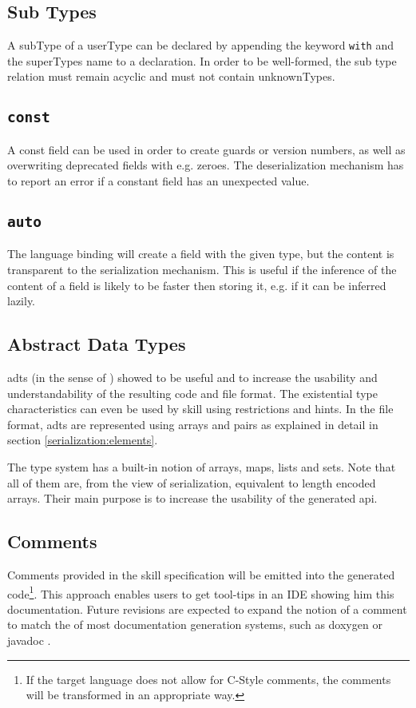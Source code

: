 \subsection{Sub Types}
A \gls{subType} of a \gls{userType} can be declared by appending the keyword \texttt{with} and the \gls{superType}s name to a declaration. In order to be well-formed, the sub type relation must remain acyclic and must not contain \glspl{unknownType}.

\subsection{\texttt{const}}
A const field can be used in order to create guards or version numbers, as well as overwriting deprecated fields with e.g. zeroes. The deserialization mechanism has to report an error if a constant field has an unexpected value.

\subsection{\texttt{auto}}
The language binding will create a field with the given type, but the content is transparent to the serialization mechanism. This is useful if the inference of the content of a field is likely to be faster then storing it, e.g. if it can be inferred lazily.


\subsection{Abstract Data Types}

\glspl{adt} (in the sense of \cite{adts}) showed to be useful and to increase the usability and understandability of the resulting code and file format. The existential type characteristics can even be used by \gls{skill} using restrictions and hints. In the file format, \glspl{adt} are represented using arrays and pairs as explained in detail in section \ref{serialization:elements}.

The type system has a built-in notion of arrays, maps, lists and sets. Note that all of them are, from the view of serialization, equivalent to length encoded arrays. Their main purpose is to increase the usability of the generated \gls{api}.


\subsection{Comments}

Comments provided in the \gls{skill} specification will be emitted into the generated code\footnote{If the target language does not allow for C-Style comments, the comments will be transformed in an appropriate way.}. This approach enables users to get tool-tips in an IDE showing him this documentation. Future revisions are expected to expand the notion of a comment to match the of most documentation generation systems, such as doxygen \cite{doxygen} or javadoc \cite{javadoc}.




